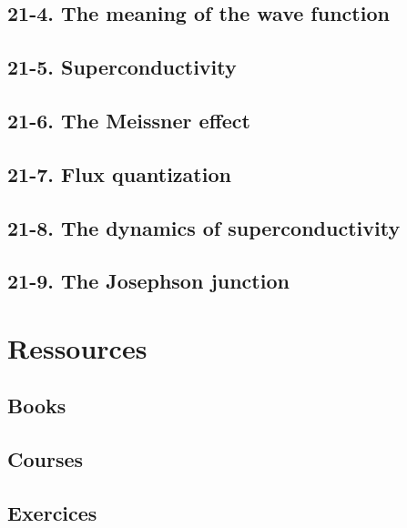 \documentclass{article}
\begin{document}
\subsection{21-4. The meaning of the wave function}
\subsection{21-5. Superconductivity}
\subsection{21-6. The Meissner effect}
\subsection{21-7. Flux quantization}
\subsection{21-8. The dynamics of superconductivity}
\subsection{21-9. The Josephson junction}

\section{Ressources}%
\label{sec:Ressources}

\subsection{Books}%
\label{sub:Books}

\subsection{Courses}%
\label{sub:Courses}

\subsection{Exercices}%
\label{sub:Exercices}
\end{document}
